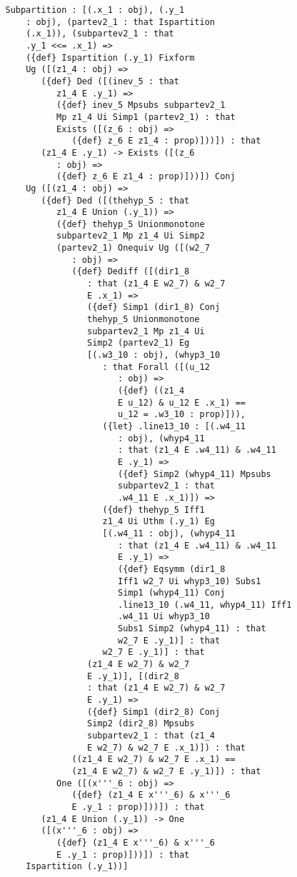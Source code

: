 \documentclass[12pt]{article}
\begin{document}
\begin{verbatim}
   Subpartition : [(.x_1 : obj), (.y_1 
       : obj), (partev2_1 : that Ispartition 
       (.x_1)), (subpartev2_1 : that 
       .y_1 <<= .x_1) => 
       ({def} Ispartition (.y_1) Fixform 
       Ug ([(z1_4 : obj) => 
          ({def} Ded ([(inev_5 : that 
             z1_4 E .y_1) => 
             ({def} inev_5 Mpsubs subpartev2_1 
             Mp z1_4 Ui Simp1 (partev2_1) : that 
             Exists ([(z_6 : obj) => 
                ({def} z_6 E z1_4 : prop)]))]) : that 
          (z1_4 E .y_1) -> Exists ([(z_6 
             : obj) => 
             ({def} z_6 E z1_4 : prop)]))]) Conj 
       Ug ([(z1_4 : obj) => 
          ({def} Ded ([(thehyp_5 : that 
             z1_4 E Union (.y_1)) => 
             ({def} thehyp_5 Unionmonotone 
             subpartev2_1 Mp z1_4 Ui Simp2 
             (partev2_1) Onequiv Ug ([(w2_7 
                : obj) => 
                ({def} Dediff ([(dir1_8 
                   : that (z1_4 E w2_7) & w2_7 
                   E .x_1) => 
                   ({def} Simp1 (dir1_8) Conj 
                   thehyp_5 Unionmonotone 
                   subpartev2_1 Mp z1_4 Ui 
                   Simp2 (partev2_1) Eg 
                   [(.w3_10 : obj), (whyp3_10 
                      : that Forall ([(u_12 
                         : obj) => 
                         ({def} ((z1_4 
                         E u_12) & u_12 E .x_1) == 
                         u_12 = .w3_10 : prop)])), 
                      ({let} .line13_10 : [(.w4_11 
                         : obj), (whyp4_11 
                         : that (z1_4 E .w4_11) & .w4_11 
                         E .y_1) => 
                         ({def} Simp2 (whyp4_11) Mpsubs 
                         subpartev2_1 : that 
                         .w4_11 E .x_1)]) => 
                      ({def} thehyp_5 Iff1 
                      z1_4 Ui Uthm (.y_1) Eg 
                      [(.w4_11 : obj), (whyp4_11 
                         : that (z1_4 E .w4_11) & .w4_11 
                         E .y_1) => 
                         ({def} Eqsymm (dir1_8 
                         Iff1 w2_7 Ui whyp3_10) Subs1 
                         Simp1 (whyp4_11) Conj 
                         .line13_10 (.w4_11, whyp4_11) Iff1 
                         .w4_11 Ui whyp3_10 
                         Subs1 Simp2 (whyp4_11) : that 
                         w2_7 E .y_1)] : that 
                      w2_7 E .y_1)] : that 
                   (z1_4 E w2_7) & w2_7 
                   E .y_1)], [(dir2_8 
                   : that (z1_4 E w2_7) & w2_7 
                   E .y_1) => 
                   ({def} Simp1 (dir2_8) Conj 
                   Simp2 (dir2_8) Mpsubs 
                   subpartev2_1 : that (z1_4 
                   E w2_7) & w2_7 E .x_1)]) : that 
                ((z1_4 E w2_7) & w2_7 E .x_1) == 
                (z1_4 E w2_7) & w2_7 E .y_1)]) : that 
             One ([(x'''_6 : obj) => 
                ({def} (z1_4 E x'''_6) & x'''_6 
                E .y_1 : prop)]))]) : that 
          (z1_4 E Union (.y_1)) -> One 
          ([(x'''_6 : obj) => 
             ({def} (z1_4 E x'''_6) & x'''_6 
             E .y_1 : prop)]))]) : that 
       Ispartition (.y_1))]



\end{verbatim}
\end{document}
